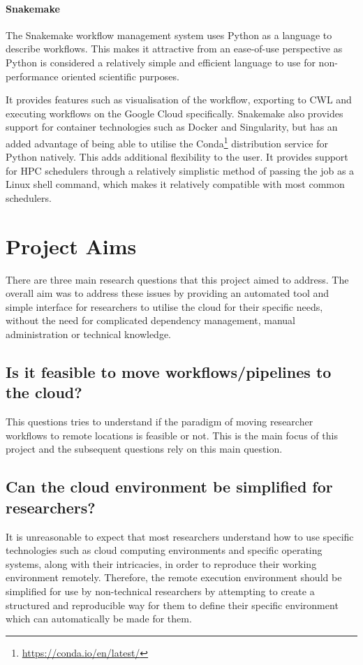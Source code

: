 \paragraph{Snakemake} The Snakemake workflow management system uses Python as a language to describe workflows. This makes it attractive from an ease-of-use perspective as Python is considered a relatively simple and efficient language to use for non-performance oriented scientific purposes\parencite{rashed2012python,muller2015python}.

It provides features such as visualisation of the workflow, exporting to CWL and executing workflows on the Google Cloud specifically. Snakemake also provides support for container technologies such as Docker and Singularity, but has an added advantage of being able to utilise the Conda\footnote{\url{https://conda.io/en/latest/}} distribution service for Python natively. This adds additional flexibility to the user. It provides support for HPC schedulers through a relatively simplistic method of passing the job as a Linux shell command, which makes it relatively compatible with most common schedulers.

\section{Project Aims}

There are three main research questions that this project aimed to address. The overall aim was to address these issues by providing an automated tool and simple interface for researchers to utilise the cloud for their specific needs, without the need for complicated dependency management, manual administration or technical knowledge.

\subsection{Is it feasible to move workflows/pipelines to the cloud?}
This questions tries to understand if the paradigm of moving researcher workflows to remote locations is feasible or not. This is the main focus of this project and the subsequent questions rely on this main question.

\subsection{Can the cloud environment be simplified for researchers?}
It is unreasonable to expect that most researchers understand how to use specific technologies such as cloud computing environments and specific operating systems, along with their intricacies, in order to reproduce their working environment remotely. Therefore, the remote execution environment should be simplified for use by non-technical researchers by attempting to create a structured and reproducible way for them to define their specific environment which can automatically be made for them.

